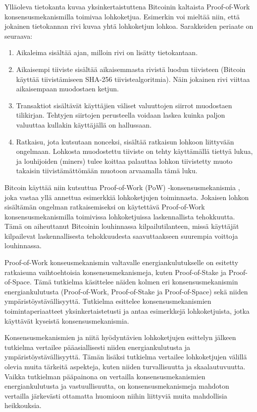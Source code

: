Ylläoleva tietokanta kuvaa yksinkertaistuttena Bitcoinin kaltaista Proof-of-Work konsensusmekanismilla toimivaa lohkoketjua. Esimerkin voi mieltää niin, että jokainen tietokannan rivi kuvaa yhtä lohkoketjun lohkoa. Sarakkeiden periaate on seuraava:

\begin{enumerate}
\item Aikaleima sisältää ajan, milloin rivi on lisätty tietokantaan.
\item Aikaisempi tiiviste sisältää aikaisemmasta rivistä luodun tiivisteen (Bitcoin käyttää tiivistämiseen SHA-256 tiivistealgoritmia). Näin jokainen rivi viittaa aikaisempaan muodostaen ketjun.
\item Transaktiot sisältävät käyttäjien väliset valuuttojen siirrot muodostaen tilikirjan. Tehtyjen siirtojen perusteella voidaan laskea kuinka paljon valuuttaa kullakin käyttäjällä on hallussaan.
\item Ratkaisu, jota kutsutaan nonceksi, sisältää ratkaisun lohkoon liittyvään ongelmaan. Lohkosta muodostettu tiiviste on tehty käyttämällä tiettyä lukua, ja louhijoiden (miners) tulee koittaa palauttaa lohkon tiivistetty muoto takaisin tiivistämättömään muotoon arvaamalla tämä luku.
\end{enumerate}

Bitcoin käyttää niin kutsuttua Proof-of-Work (PoW) -konsensusmekanismia \cite{satoshibitcoin}, joka vastaa yllä annettua esimerkkiä lohkoketjujen toiminnasta. Jokaisen lohkon sisältämän ongelman ratkaisemiseksi on käytettävä Proof-of-Work konsensusmekanismilla toimivissa lohkoketjuissa laskennallista tehokkuutta. Tämä on aiheuttanut Bitcoinin louhinnassa kilpailutilanteen, missä käyttäjät kilpailevat laskennallisesta tehokkuudesta saavuttaakseen suurempia voittoja louhinnassa.

Proof-of-Work konseusmekanismin valtavalle energiankulutukselle on esitetty ratkaisuna vaihtoehtoisia konsensusmekanismeja, kuten Proof-of-Stake ja Proof-of-Space. Tämä tutkielma käsittelee näiden kolmen eri konsensusmekanismin energiankulutusta (Proof-of-Work, Proof-of-Stake ja Proof-of-Space) sekä niiden ympäristöystävällisyyttä. Tutkielma esittelee konsensusmekanismien toimintaperiaatteet yksinkertaistetusti ja antaa esimerkkejä lohkoketjuista, jotka käyttävät kyseistä konsensusmekanismia.

Konsensusmekanismien ja niitä hyödyntävien lohkoketjujen esittelyn jälkeen tutkielma vertailee pääasiallisesti niiden energiankulutusta ja ympäristöystävällisyyttä. Tämän lisäksi tutkielma vertailee lohkoketjujen välillä olevia muita tärkeitä aspekteja, kuten niiden turvallisuutta ja skaalautuvuutta. Vaikka tutkielman pääpainona on vertailla konsensusmekanismien energiankulutusta ja vastuullisuutta, on konsensusmekanismeja mahdoton vertailla järkevästi ottamatta huomioon niihin liittyviä muita mahdollisia heikkouksia.

